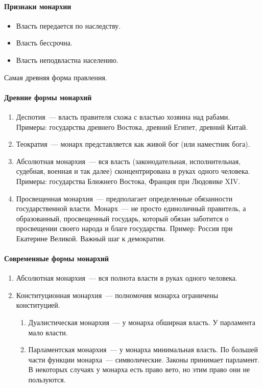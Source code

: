 \documentclass[12pt]{article}
\begin{document}
	\paragraph{Признаки монархии}
	\begin{itemize}
		\item Власть передается по наследству.
		\item Власть бессрочна.
		\item Власть неподвластна населению.
	\end{itemize}
	\begin{note}
		Самая древняя форма правления.
	\end{note}
	\paragraph{Древние формы монархий}
	\begin{enumerate}
		\item Деспотия~--- власть правителя схожа с властью хозяина над рабами. Примеры: государства древнего Востока, древний Египет, древний Китай.
		\item Теократия~--- монарх представляется как живой бог (или наместник бога).
		\item Абсолютная монархия~--- вся власть (законодательная, исполнительная, судебная, военная и так далее) сконцентрирована в руках одного человека. Примеры: государства Ближнего Востока, Франция при Людовике XIV.
		\item Просвещенная монархия~--- предполагает определенные обязанности государственной власти. Монарх~--- не просто единоличный правитель, а образованный, просвещенный государь, который обязан заботится о просвещении своего народа и благе государства. Пример: Россия при Екатерине Великой. Важный шаг к демократии.
	\end{enumerate}
	\paragraph{Современные формы монархий}
	\begin{enumerate}
		\item Абсолютная монархия~--- вся полнота власти в руках одного человека.
		\item Конституционная монархия~--- полномочия монарха ограничены конституцией.
		\begin{enumerate}
			\item Дуалистическая монархия~--- у монарха обширная власть. У парламента мало власти.
			\item Парламентская монархия~--- у монарха минимальная власть. По большей части функции монарха~--- символические. Законы принимает парламент. В некоторых случаях у монарха есть право вето, но этим право они не пользуются.
		\end{enumerate}
	\end{enumerate}
\end{document}
